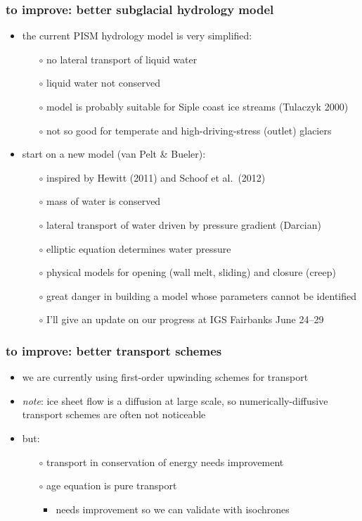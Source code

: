 \documentclass[hide notes,intlimits]{beamer}
\begin{document}
\begin{frame}
  \frametitle{to improve: better subglacial hydrology model}
  \begin{itemize}
  \item the current PISM hydrology model is very simplified:
    \begin{itemize}
    \item[$\circ$] no lateral transport of liquid water
    \item[$\circ$] liquid water not conserved
    \item[$\circ$] model is probably suitable for Siple coast ice streams (Tulaczyk 2000)
    \item[$\circ$] not so good for temperate and high-driving-stress (outlet) glaciers
    \end{itemize}
  \item start on a new model (van Pelt \& Bueler):
    \begin{itemize}
    \item[$\circ$] inspired by Hewitt (2011) and Schoof et al.~(2012)
    \item[$\circ$] mass of water is conserved
    \item[$\circ$] lateral transport of water driven by pressure gradient (Darcian)
    \item[$\circ$] elliptic equation determines water pressure
    \item[$\circ$] physical models for opening (wall melt, sliding) and closure (creep)
    \item[$\circ$] \alert{great danger} in building a model whose parameters cannot be identified
    \item[$\circ$] I'll give an update on our progress at IGS Fairbanks June 24--29
    \end{itemize}
  \end{itemize}
\end{frame}


\begin{frame}
  \frametitle{to improve: better transport schemes}
  \begin{itemize}
  \item we are currently using first-order upwinding schemes for transport
  \item \emph{note}: ice sheet flow is a diffusion at large scale, so numerically-diffusive transport schemes are often not noticeable
  \item \alert{but}:
    \begin{itemize}
    \item[$\circ$] transport in conservation of energy needs improvement
    \item[$\circ$] age equation is pure transport
      \begin{itemize}
      \item needs improvement so we can validate with isochrones
      \end{itemize}
    \end{itemize}
  \end{itemize}
\end{frame}
\end{document}
